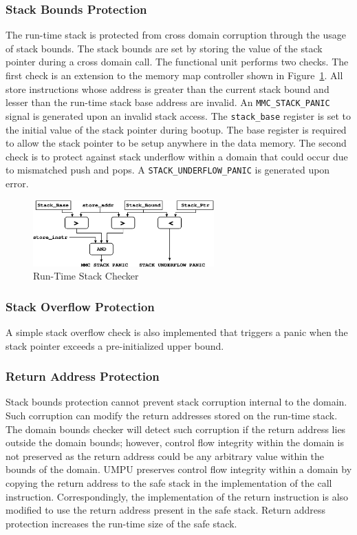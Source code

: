 \subsubsection{Stack Bounds Protection}
The run-time stack is protected from cross domain corruption through
the usage of stack bounds.
%
The stack bounds are set by storing the value of the stack pointer
during a cross domain call.
%
The functional unit performs two checks.
%
The first check is an extension to the memory map controller shown in
Figure~\ref{fig:stackbndscheck}.
%
All store instructions whose address is greater than the current stack
bound and lesser than the run-time stack base address are invalid.
%
An \texttt{MMC\_STACK\_PANIC} signal is generated upon an invalid stack
access.
%
The \texttt{stack\_base} register is set to the initial value
of the stack pointer during bootup.
%
The base register is required to allow the stack pointer to be setup
anywhere in the data memory.
%
The second check is to protect against stack underflow within a domain
that could occur due to mismatched push and pops.
%
A \texttt{STACK\_UNDERFLOW\_PANIC} is generated upon error.
%
\begin{figure}[htbp]
  \centering
  \includegraphics[height=1in,
  keepaspectratio=true]{figures/umpustackprot.eps} 
  \caption{Run-Time Stack Checker}
  \label{fig:stackbndscheck}
\end{figure}
%
\subsubsection{Stack Overflow Protection}
A simple stack overflow check is also implemented that
triggers a panic when the stack pointer exceeds a pre-initialized
upper bound.
\subsubsection{Return Address Protection}
%
Stack bounds protection cannot prevent stack corruption internal to the domain.
%
Such corruption can modify the return addresses stored on the run-time stack.
%
The domain bounds checker will detect such corruption if the return address lies outside the domain bounds;
%
however, control flow integrity within the domain is not preserved as
the return address could be any arbitrary value within the bounds of
the domain.
%
UMPU preserves control flow integrity within a domain by copying the
return address to the safe stack in the implementation of the call
instruction.
%
Correspondingly, the implementation of the return instruction is also
modified to use the return address present in the safe stack.
%
Return address protection increases the run-time size of the safe stack.
%
